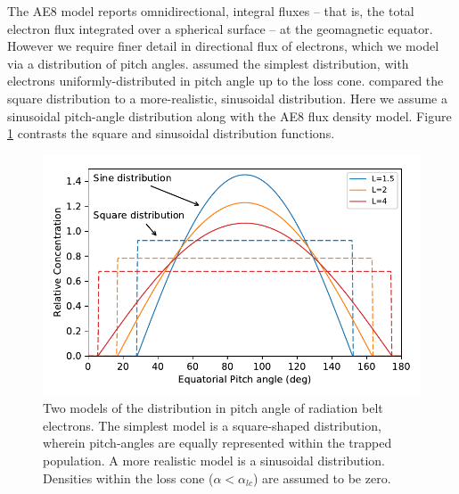 The AE8 model reports omnidirectional, integral fluxes -- that is, the total electron flux integrated over a spherical surface -- at the geomagnetic equator. However we require finer detail in directional flux of electrons, which we model via a distribution of pitch angles. \cite{Lauben1998} assumed the simplest distribution, with electrons uniformly-distributed in pitch angle up to the loss cone. \cite{Bortnik2005} compared the square distribution to a more-realistic, sinusoidal distribution. Here we assume a sinusoidal pitch-angle distribution along with the AE8 flux density model. Figure \ref{fig:pitchangledistributions} contrasts the square and sinusoidal distribution functions.


\begin{figure}
\begin{center}
\includegraphics{figures/pitch-angle_distributions.pdf}
\caption[Pitch-angle distribution functions]{Two models of the distribution in pitch angle of radiation belt electrons. The simplest model is a square-shaped distribution, wherein pitch-angles are equally represented within the trapped population. A more realistic model is a sinusoidal distribution. Densities within the loss cone ($\alpha < \alpha_{lc}$) are assumed to be zero.}
\label{fig:pitchangledistributions}
\end{center}
\end{figure}


